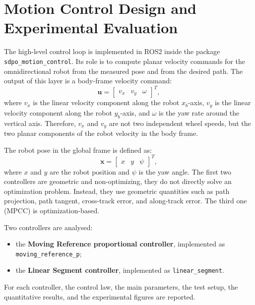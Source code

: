 \chapter{Motion Control Design and Experimental Evaluation}
\label{chap:motion_control_design}

The high-level control loop is implemented in ROS2 inside the package
\texttt{sdpo\_motion\_control}. Its role is to compute planar velocity commands
for the omnidirectional robot from the measured pose and from the desired path.
The output of this layer is a body-frame velocity command:
\begin{equation}
    \mathbf{u}
    =
    \begin{bmatrix}
        v_x & v_y & \omega
    \end{bmatrix}^{T},
\end{equation}
where \(v_x\) is the linear velocity component along the robot \(x_b\)-axis,
  \(v_y\) is the linear velocity component along the robot \(y_b\)-axis, and
  \(\omega\) is the yaw rate around the vertical axis. Therefore, \(v_x\) and
  \(v_y\) are not two independent wheel speeds, but the two planar components of
  the robot velocity in the body frame.


The robot pose in the global frame is defined as:
\begin{equation}
    \mathbf{x}
    =
    \begin{bmatrix}
        x & y & \psi
    \end{bmatrix}^{T},
\end{equation}
where \(x\) and \(y\) are the robot position and \(\psi\) is the yaw angle. The first two controllers are geometric and non-optimizing, they do not directly solve an optimization problem. Instead, they use geometric quantities such as path projection, path tangent, cross-track error, and along-track error. The third one (MPCC) is optimization-based.

\vspace{0.2cm}

Two controllers are analysed:
\begin{itemize}
    \item the \textbf{Moving Reference proportional controller}, implemented as
    \texttt{moving\_reference\_p};
    \item the \textbf{Linear Segment controller}, implemented as
    \texttt{linear\_segment}.
\end{itemize}

For each controller, the control law, the main parameters, the test setup, the
quantitative results, and the experimental figures are reported.


